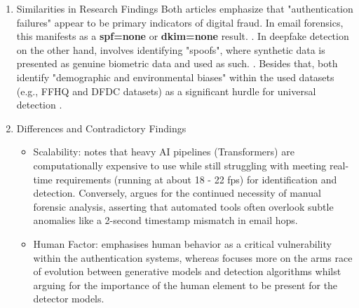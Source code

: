 \documentclass[12pt,a4paper]{article}
\begin{document}
\begin{enumerate}
\item Similarities in Research Findings
Both articles emphasize that "authentication failures" appear to be primary indicators of digital fraud. In email forensics, this manifests as a \textbf{spf=none} or \textbf{dkim=none} result. \cite{11480014}. 
In deepfake detection on the other hand, involves identifying "spoofs", where synthetic data is presented as genuine biometric data and used as such. \cite{SINGH2025103632}. 
Besides that, both identify "demographic and environmental biases" within the used datasets (e.g., FFHQ and DFDC datasets) as a significant hurdle for universal detection \cite{SINGH2025103632}.

\item Differences and Contradictory Findings

\begin{itemize}
\item Scalability: \cite{SINGH2025103632} notes that heavy AI pipelines (Transformers) are computationally expensive to use while still struggling with meeting real-time requirements (running at about 18 - 22 fps) for identification and detection. 
Conversely, \cite{11480014} argues for the continued necessity of manual forensic analysis, asserting that automated tools often overlook subtle anomalies like a 2-second timestamp mismatch in email hops.

\item Human Factor: \cite{11480014} emphasises human behavior as a critical vulnerability within the authentication systems, whereas \cite{SINGH2025103632} focuses more on the arms race of evolution between generative models and detection algorithms whilst arguing for the importance of the human element to be present for the detector models.

\end{itemize}
\end{enumerate}
\end{document}
